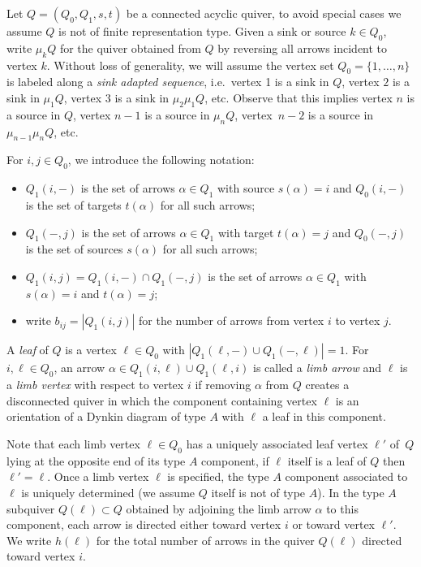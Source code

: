 \documentclass{amsart}
\numberwithin{equation}{section}
\begin{document}
Let $Q=(Q_0,Q_1,s,t)$ be a connected acyclic quiver, to avoid special cases we assume $Q$ is not of finite representation type.
Given a sink or source $k\in Q_0$, write $\mu_k Q$ for the quiver obtained from $Q$ by reversing all arrows incident to vertex $k$.
Without loss of generality, we will assume the vertex set $Q_0=\{1,\ldots,n\}$ is labeled along a \emph{sink adapted sequence}, i.e.~vertex 1 is a sink in $Q$, vertex $2$ is a sink in $\mu_1 Q$, vertex $3$ is a sink in $\mu_2\mu_1 Q$, etc.
Observe that this implies vertex $n$ is a source in $Q$, vertex $n-1$ is a source in $\mu_n Q$, vertex~$n-2$ is a source in $\mu_{n-1}\mu_n Q$, etc.

For $i,j\in Q_0$, we introduce the following notation:
\begin{itemize}
  \item $Q_1(i,-)$ is the set of arrows $\alpha\in Q_1$ with source $s(\alpha)=i$ and $Q_0(i,-)$ is the set of targets $t(\alpha)$ for all such arrows;
  \item $Q_1(-,j)$ is the set of arrows $\alpha\in Q_1$ with target $t(\alpha)=j$ and $Q_0(-,j)$ is the set of sources $s(\alpha)$ for all such arrows;
  \item $Q_1(i,j)=Q_1(i,-)\cap Q_1(-,j)$ is the set of arrows $\alpha\in Q_1$ with $s(\alpha)=i$ and $t(\alpha)=j$;
  \item write $b_{ij}=|Q_1(i,j)|$ for the number of arrows from vertex $i$ to vertex $j$.
\end{itemize}

A \emph{leaf} of $Q$ is a vertex $\ell\in Q_0$ with $|Q_1(\ell,-)\cup Q_1(-,\ell)|=1$.
For $i,\ell\in Q_0$, an arrow $\alpha\in Q_1(i,\ell)\cup Q_1(\ell,i)$ is called a \emph{limb arrow} and $\ell$ is a \emph{limb vertex} with respect to vertex $i$ if removing $\alpha$ from $Q$ creates a disconnected quiver in which the component containing vertex $\ell$ is an orientation of a Dynkin diagram of type $A$ with $\ell$ a leaf in this component.

Note that each limb vertex $\ell\in Q_0$ has a uniquely associated leaf vertex $\ell'$ of~$Q$ lying at the opposite end of its type $A$ component, if $\ell$ itself is a leaf of $Q$ then $\ell'=\ell$.
Once a limb vertex $\ell$ is specified, the type $A$ component associated to $\ell$ is uniquely determined (we assume $Q$ itself is not of type $A$).
In the type $A$ subquiver $Q(\ell)\subset Q$ obtained by adjoining the limb arrow $\alpha$ to this component, each arrow is directed either toward vertex $i$ or toward vertex $\ell'$.
We write $h(\ell)$ for the total number of arrows in the quiver $Q(\ell)$ directed toward vertex $i$.
\end{document}
